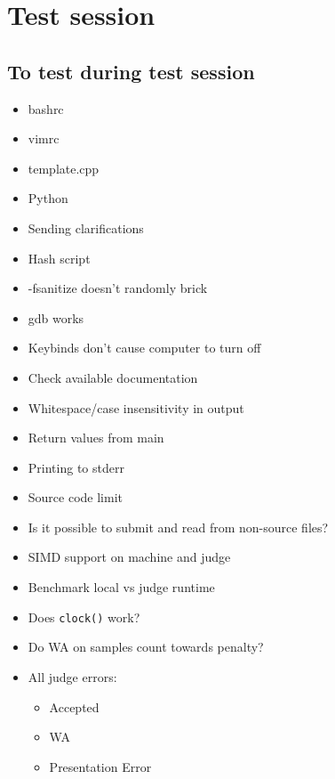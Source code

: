 \chapter{Test session}

\section{To test during test session}
\begin{itemize}
	\item bashrc
	\item vimrc
	\item template.cpp
	\item Python
	\item Sending clarifications
	\item Hash script
	\item -fsanitize doesn't randomly brick
	\item gdb works
	\item Keybinds don't cause computer to turn off
	\item Check available documentation
	\item Whitespace/case insensitivity in output
	\item Return values from main
	\item Printing to stderr
	\item Source code limit
	\item Is it possible to submit and read from non-source files?
	\item SIMD support on machine and judge
	\item Benchmark local vs judge runtime
	\item Does \texttt{clock()} work?
	\item Do WA on samples count towards penalty?
	\item All judge errors:
		\begin{itemize}
			\item Accepted
			\item WA
			\item Presentation Error

\end{itemize}
\end{itemize}
